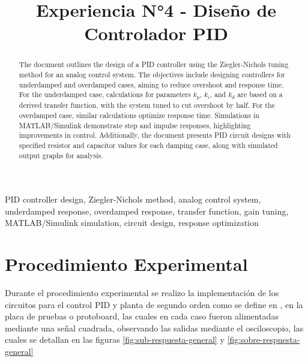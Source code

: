 \documentclass[conference]{IEEEtran}
\begin{document}
	
	\title{Experiencia N°4 - Diseño de Controlador PID}
	
	\author{
		\and
		\and
	}
	\maketitle
	
	\begin{abstract}
		The document outlines the design of a PID controller using the Ziegler-Nichols tuning method for an analog control system. The objectives include designing controllers for underdamped and overdamped cases, aiming to reduce overshoot and response time. For the underdamped case, calculations for parameters \( k_p \), \( k_i \), and \( k_d \) are based on a derived transfer function, with the system tuned to cut overshoot by half. For the overdamped case, similar calculations optimize response time. Simulations in MATLAB/Simulink demonstrate step and impulse responses, highlighting improvements in control. Additionally, the document presents PID circuit designs with specified resistor and capacitor values for each damping case, along with simulated output graphs for analysis.
	\end{abstract}
	
	\begin{IEEEkeywords}
		PID controller design, Ziegler-Nichols method, analog control system, underdamped response, overdamped response, transfer function, gain tuning, MATLAB/Simulink simulation, circuit design, response optimization
	\end{IEEEkeywords}
	\section{Procedimiento Experimental}
	Durante el procedimiento experimental se realizo la implementación de los circuitos para el control PID y planta de segundo orden como se define en \cite{ogata2015}, en la placa de pruebas o protoboard, las cuales en cada caso fueron alimentadas mediante una señal cuadrada, observando las salidas mediante el osciloscopio, las cuales se detallan en las figuras \ref{fig:sub-respuesta-general} y \ref{fig:sobre-respuesta-general}
	
\end{document}

